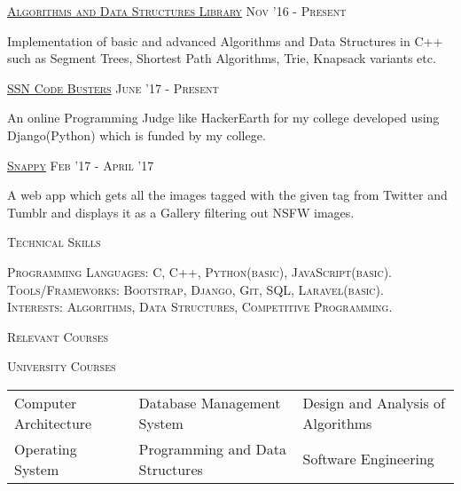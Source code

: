 \documentclass[10pt]{article}
\begin{document}
	\large{\textsc{\href{https://chamow97.github.io/Algorithm-DS-Library/}{Algorithms and Data Structures Library}}   \hfill \small\textsc{Nov '16 - Present}
	\begin{itemize}
	\small
	{
	\item Implementation of basic and advanced Algorithms and Data Structures in C++ such as Segment Trees, Shortest Path Algorithms, Trie, Knapsack variants etc.
	}
	\end{itemize}	
	\vspace{2mm}
	\large{\textsc{\href{https://chamow97.github.io/SSNCB/}{SSN Code Busters}}}   \hfill \small\textsc{June '17 - Present}
	\begin{itemize}
	\small
	{
	\item An online Programming Judge like HackerEarth for my college developed using Django(Python) which is funded by my college.
	}
	\end{itemize}	
	\vspace{2mm}
	\large{\textsc{\href{https://chamow97.github.io/snappy/}{Snappy}}}   \hfill \small\textsc{Feb '17 - April '17}
	\begin{itemize}
	\small
	{
	\item A web app which gets all the images tagged with the given tag from Twitter and Tumblr and displays it as a Gallery filtering out NSFW images.
	}
	\end{itemize}	
	\vspace{3mm}
	
		{\centering\Large{\textsc{Technical Skills}}\hrulefill}
	
	\vspace{3mm}

	\normalsize{
	\textsc{Programming Languages:} \textsc{C, C++, Python(basic), JavaScript(basic).} \\
	\textsc{Tools/Frameworks:} \textsc{Bootstrap, Django, Git, SQL, Laravel(basic).}
	}\\
	\textsc{Interests:} \textsc{Algorithms, Data Structures, Competitive Programming.}
			
	\vspace{4mm}
		{\centering\Large{\textsc{Relevant Courses}}\hrulefill}
		
	\vspace{4mm}
	\large{\textsc{University Courses}}
	\vspace{2mm}
	\begin{small}
	
	\begin{tabular}{p{7.2cm} p{5.7cm} p{6cm}}
	{Computer Architecture} & {Database Management System} &{Design and Analysis of Algorithms}\\
	{Operating System} & {Programming and Data Structures} &	{Software Engineering}\\
	\end{tabular}
	

\end{small}}
\end{document}
